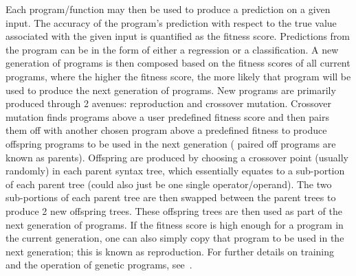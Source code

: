 Each program/function may then be used to produce a prediction on a given 
input. The accuracy of the program's prediction with respect to the true value 
associated with the given input is quantified as the fitness score. 
Predictions from the program can be in the form of either a 
regression or a classification. A new 
generation of programs is then composed based on the fitness scores of 
all current programs, where the higher the fitness score, the more likely 
that program will be used to produce the next generation of programs. 
New programs are primarily produced through 2 avenues: reproduction and 
crossover mutation. Crossover mutation finds programs above a user predefined 
fitness score and then pairs them off 
with another chosen program above a predefined fitness 
to produce offspring programs to be used in the next generation (
paired off programs are known as parents). Offspring 
are produced by choosing a crossover point (usually randomly) in each 
parent syntax tree, which essentially equates to a sub-portion 
of each parent tree (could also just be one single operator/operand). 
The two sub-portions of each parent tree 
are then swapped between the parent trees to produce 2 new 
offspring trees. These offspring trees are then used as part of the next 
generation of programs. If the fitness score is high enough for a program 
in the current generation, one can also simply copy that program 
to be used in the next generation; this is known as reproduction. 
For further details on training and the operation of 
genetic programs, see~\cite{field_guide_gp}.

